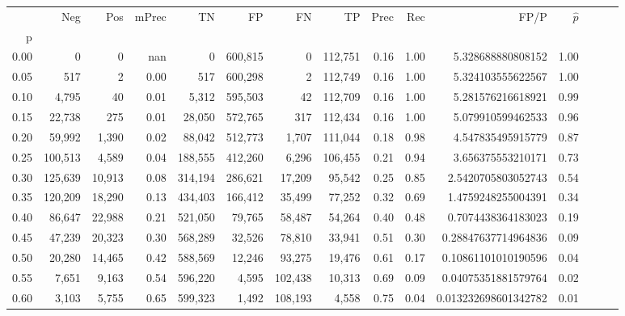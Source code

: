 \begin{tabular}{rrrrrrrrrrrrrrr}
\toprule
{} &      Neg &     Pos & mPrec &       TN &       FP &       FN &       TP &  Prec &   Rec &                    FP/P & $\hat{p}$ \\
p    &          &         &       &          &          &          &          &       &       &                         &           \\
\midrule
0.00 &        0 &       0 &   nan &        0 &  600,815 &        0 &  112,751 &  0.16 &  1.00 &       5.328688880808152 &      1.00 \\
0.05 &      517 &       2 &  0.00 &      517 &  600,298 &        2 &  112,749 &  0.16 &  1.00 &       5.324103555622567 &      1.00 \\
0.10 &    4,795 &      40 &  0.01 &    5,312 &  595,503 &       42 &  112,709 &  0.16 &  1.00 &       5.281576216618921 &      0.99 \\
0.15 &   22,738 &     275 &  0.01 &   28,050 &  572,765 &      317 &  112,434 &  0.16 &  1.00 &       5.079910599462533 &      0.96 \\
0.20 &   59,992 &   1,390 &  0.02 &   88,042 &  512,773 &    1,707 &  111,044 &  0.18 &  0.98 &       4.547835495915779 &      0.87 \\
0.25 &  100,513 &   4,589 &  0.04 &  188,555 &  412,260 &    6,296 &  106,455 &  0.21 &  0.94 &       3.656375553210171 &      0.73 \\
0.30 &  125,639 &  10,913 &  0.08 &  314,194 &  286,621 &   17,209 &   95,542 &  0.25 &  0.85 &      2.5420705803052743 &      0.54 \\
0.35 &  120,209 &  18,290 &  0.13 &  434,403 &  166,412 &   35,499 &   77,252 &  0.32 &  0.69 &      1.4759248255004391 &      0.34 \\
0.40 &   86,647 &  22,988 &  0.21 &  521,050 &   79,765 &   58,487 &   54,264 &  0.40 &  0.48 &      0.7074438364183023 &      0.19 \\
0.45 &   47,239 &  20,323 &  0.30 &  568,289 &   32,526 &   78,810 &   33,941 &  0.51 &  0.30 &     0.28847637714964836 &      0.09 \\
0.50 &   20,280 &  14,465 &  0.42 &  588,569 &   12,246 &   93,275 &   19,476 &  0.61 &  0.17 &     0.10861101010190596 &      0.04 \\
0.55 &    7,651 &   9,163 &  0.54 &  596,220 &    4,595 &  102,438 &   10,313 &  0.69 &  0.09 &     0.04075351881579764 &      0.02 \\
0.60 &    3,103 &   5,755 &  0.65 &  599,323 &    1,492 &  108,193 &    4,558 &  0.75 &  0.04 &    0.013232698601342782 &      0.01 \\

\end{tabular}
